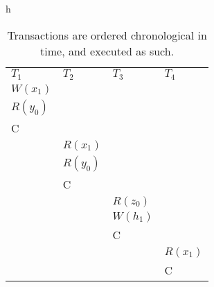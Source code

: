 \begin{table}{h}
    \begin{tabular}{l|l|l|l}
        $T_1$            & $T_2$            & $T_3$   & $T_4$   \\
        $W(x_1)$ &      &      &      \\
        $R(y_0)$ &      &      &      \\
        C    &      &      &      \\
        & $R(x_1)$ &      &      \\
        & $R(y_0)$ &      &      \\
        & C    &      &      \\
        &      & $R(z_0)$ &      \\
        &      & $W(h_1)$ &      \\
        &      & C    &      \\
        &      &      & $R(x_1)$ \\
        &      &      & C
    \end{tabular}
    \caption{Transactions are ordered chronological in time, and executed as such.}
\end{table}
